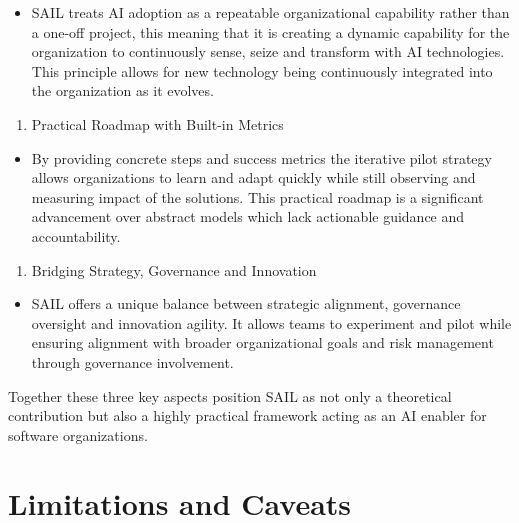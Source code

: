 \documentclass[]{imc-inf}
\def\tightlist{}
\begin{document}
\begin{itemize}
	\tightlist
	\item
	SAIL treats AI adoption as a repeatable organizational capability
	rather than a one-off project, this meaning that it is creating a
	dynamic capability for the organization to continuously sense, seize
	and transform with AI technologies. This principle allows for new
	technology being continuously integrated into the organization as it
	evolves.
\end{itemize}

\begin{enumerate}
	\def\labelenumi{\arabic{enumi}.}
	\setcounter{enumi}{1}
	\tightlist
	\item
	Practical Roadmap with Built-in Metrics
\end{enumerate}

\begin{itemize}
	\tightlist
	\item
	By providing concrete steps and success metrics the iterative pilot
	strategy allows organizations to learn and adapt quickly while still
	observing and measuring impact of the solutions. This practical
	roadmap is a significant advancement over abstract models which lack
	actionable guidance and accountability.
\end{itemize}

\begin{enumerate}
	\def\labelenumi{\arabic{enumi}.}
	\setcounter{enumi}{2}
	\tightlist
	\item
	Bridging Strategy, Governance and Innovation
\end{enumerate}

\begin{itemize}
	\tightlist
	\item
	SAIL offers a unique balance between strategic alignment, governance
	oversight and innovation agility. It allows teams to experiment and
	pilot while ensuring alignment with broader organizational goals and
	risk management through governance involvement.
\end{itemize}

Together these three key aspects position SAIL as not only a theoretical
contribution but also a highly practical framework acting as an AI
enabler for software organizations.

\section{Limitations and Caveats}\label{limitations-and-caveats}
\end{document}

